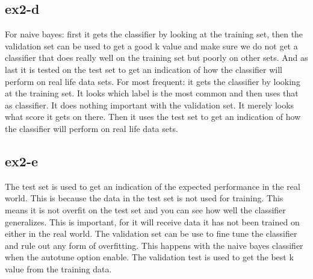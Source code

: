 \subsection{ex2-d}
For naive bayes: first it gets the classifier by looking at the training set, then the 
validation set can be used to get a good k value and make sure we do not
get a classifier that does really well on the training set but poorly on other sets.
And as last it is tested on the test set to get an indication of how the classifier will
perform on real life data sets.
For  most frequent: it gets the classifier by looking at the training set. It looks which label
is the most common and then uses that as classifier. It does nothing important with the validation set.
It merely looks what score it gets on there. Then it uses the test set to get an indication 
of how the classifier will perform on real life data sets.


\subsection{ex2-e}
The test set is used to get an indication of the expected performance in the real world. This is because the data in the test set is not used for training. This means it is not overfit on the test set and you can see how well the classifier generalizes. This is important, for it will receive data it has not been trained on either in the real world. The validation set can be use to fine tune the classifier and rule out any
form of overfitting. This happens with the naive bayes classifier when the autotune option enable. 
The validation test is used to get the best k value from the training data.
